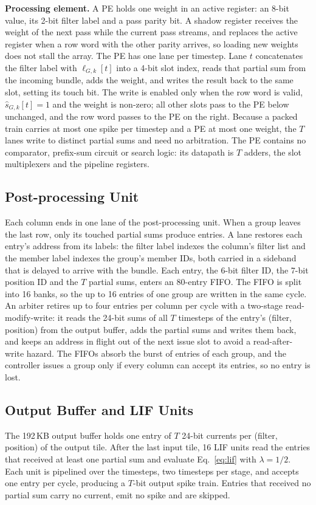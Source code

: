 \textbf{Processing element.} A PE holds one weight in an active register: an 8-bit value, its 2-bit filter label
and a pass parity bit. A shadow register receives the weight of the next pass while the current pass streams, and
replaces the active register when a row word with the other parity arrives, so loading new weights does not stall
the array. The PE has one lane per timestep. Lane $t$ concatenates the filter label with $\ell_{G,k}[t]$ into a
4-bit slot index, reads that partial sum from the incoming bundle, adds the weight, and writes the result back to
the same slot, setting its touch bit. The write is enabled only when the row word is valid, $\hat s_{G,k}[t] = 1$
and the weight is non-zero; all other slots pass to the PE below unchanged, and the row word passes to the PE on
the right. Because a packed train carries at most one spike per timestep and a PE at most one weight, the $T$
lanes write to distinct partial sums and need no arbitration. The PE contains no comparator, prefix-sum circuit or
search logic: its datapath is $T$ adders, the slot multiplexers and the pipeline registers.

\subsection{Post-processing Unit}
\label{sec:arch-post}
Each column ends in one lane of the post-processing unit. When a group leaves the last row, only its touched
partial sums produce entries. A lane restores each entry's address from its labels: the filter label indexes the
column's filter list and the member label indexes the group's member IDs, both carried in a sideband that is
delayed to arrive with the bundle. Each entry, the 6-bit filter ID, the 7-bit position ID and the $T$ partial
sums, enters an 80-entry FIFO. The FIFO is split into 16 banks, so the up to 16 entries of one group are written in
the same cycle. An arbiter retires up to four entries per column per cycle with a two-stage read-modify-write: it
reads the 24-bit sums of all $T$ timesteps of the entry's (filter, position) from the output buffer, adds the
partial sums and writes them back, and keeps an address in flight out of the next issue slot to avoid a
read-after-write hazard. The FIFOs absorb the burst of entries of each group, and the controller issues a group
only if every column can accept its entries, so no entry is lost.

\subsection{Output Buffer and LIF Units}
\label{sec:arch-lif}
The 192\,KB output buffer holds one entry of $T$ 24-bit currents per (filter, position) of the output tile. After
the last input tile, 16 LIF units read the entries that received at least one partial sum and evaluate
Eq.~\eqref{eq:lif} with $\lambda = 1/2$. Each unit is pipelined over the timesteps, two timesteps per stage, and
accepts one entry per cycle, producing a $T$-bit output spike train. Entries that received no partial sum carry no
current, emit no spike and are skipped.


